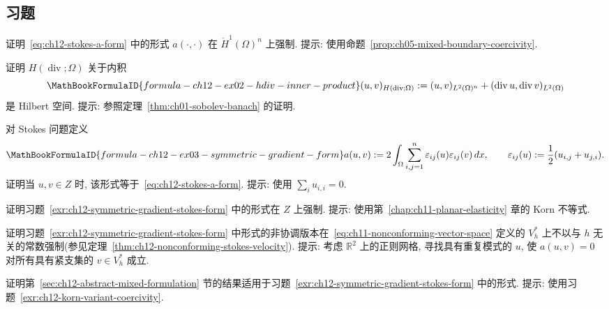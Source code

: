 \subsection{习题}
\label{sec:ch12-exercises}
\setcounter{exerciseitem}{0}

\begin{MBExercise}
\label{exr:ch12-coercivity-stokes-a}
证明~\eqref{eq:ch12-stokes-a-form} 中的形式 $a(\cdot,\cdot)$ 在 $\mathring H^1(\Omega)^n$ 上强制. 提示: 使用命题~\ref{prop:ch05-mixed-boundary-coercivity}.
\end{MBExercise}

\begin{MBExercise}
\label{exr:ch12-hdiv-hilbert}
证明 $H(\operatorname{div};\Omega)$ 关于内积
\[
\MathBookFormulaID{formula-ch12-ex02-hdiv-inner-product}
(u,v)_{H(\operatorname{div};\Omega)}
:=(u,v)_{L^2(\Omega)^n}
+(\operatorname{div}u,\operatorname{div}v)_{L^2(\Omega)}
\]
是 Hilbert 空间. 提示: 参照定理~\ref{thm:ch01-sobolev-banach} 的证明.
\end{MBExercise}

\begin{MBExercise}
\label{exr:ch12-symmetric-gradient-stokes-form}
对 Stokes 问题定义
\[
\MathBookFormulaID{formula-ch12-ex03-symmetric-gradient-form}
a(u,v):=2\int_\Omega\sum_{i,j=1}^n
\varepsilon_{ij}(u)\varepsilon_{ij}(v)\,dx,
\qquad
\varepsilon_{ij}(u):=\frac12(u_{i,j}+u_{j,i}).
\]
证明当 $u,v\in Z$ 时, 该形式等于~\eqref{eq:ch12-stokes-a-form}. 提示: 使用 $\sum_i u_{i,i}=0$.
\end{MBExercise}

\begin{MBExercise}
\label{exr:ch12-korn-variant-coercivity}
证明习题~\ref{exr:ch12-symmetric-gradient-stokes-form} 中的形式在 $Z$ 上强制. 提示: 使用第~\ref{chap:ch11-planar-elasticity} 章的 Korn 不等式.
\end{MBExercise}

\begin{MBExercise}
\label{exr:ch12-nonconforming-symmetric-gradient-not-coercive}
证明习题~\ref{exr:ch12-symmetric-gradient-stokes-form} 中形式的非协调版本在~\eqref{eq:ch11-nonconforming-vector-space} 定义的 $V_h^*$ 上不以与 $h$ 无关的常数强制(参见定理~\ref{thm:ch12-nonconforming-stokes-velocity}). 提示: 考虑 $\mathbb R^2$ 上的正则网格, 寻找具有重复模式的 $u$, 使 $a(u,v)=0$ 对所有具有紧支集的 $v\in V_h^*$ 成立.
\end{MBExercise}

\begin{MBExercise}
\label{exr:ch12-symmetric-gradient-mixed-formulation}
证明第~\ref{sec:ch12-abstract-mixed-formulation} 节的结果适用于习题~\ref{exr:ch12-symmetric-gradient-stokes-form} 中的形式. 提示: 使用习题~\ref{exr:ch12-korn-variant-coercivity}.
\end{MBExercise}

